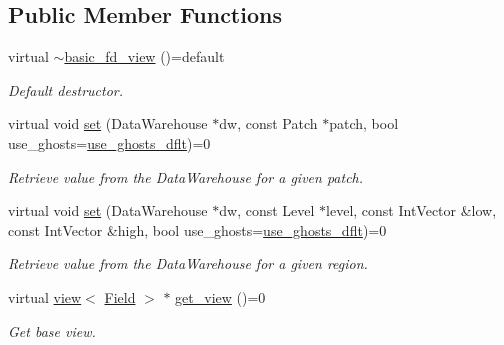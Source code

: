 \subsection*{Public Member Functions}
\begin{DoxyCompactItemize}
\item 
virtual \hyperlink{classUintah_1_1PhaseField_1_1detail_1_1basic__fd__view_3_01ScalarField_3_01T_01_4_00_01STN_01_4_ac8440931815c622c28fd417f9a81fdb9}{$\sim$basic\+\_\+fd\+\_\+view} ()=default
\begin{DoxyCompactList}\small\item\em Default destructor. \end{DoxyCompactList}\item 
virtual void \hyperlink{classUintah_1_1PhaseField_1_1detail_1_1basic__fd__view_3_01ScalarField_3_01T_01_4_00_01STN_01_4_a26d507d016ee4c943903214e7547594a}{set} (Data\+Warehouse $\ast$dw, const Patch $\ast$patch, bool use\+\_\+ghosts=\hyperlink{classUintah_1_1PhaseField_1_1detail_1_1basic__fd__view_3_01ScalarField_3_01T_01_4_00_01STN_01_4_a2faa49acca4f2f6983d318ae64e3ed39}{use\+\_\+ghosts\+\_\+dflt})=0
\begin{DoxyCompactList}\small\item\em Retrieve value from the Data\+Warehouse for a given patch. \end{DoxyCompactList}\item 
virtual void \hyperlink{classUintah_1_1PhaseField_1_1detail_1_1basic__fd__view_3_01ScalarField_3_01T_01_4_00_01STN_01_4_aa5cbbb3b73ea2933659cb082c6d6d863}{set} (Data\+Warehouse $\ast$dw, const Level $\ast$level, const Int\+Vector \&low, const Int\+Vector \&high, bool use\+\_\+ghosts=\hyperlink{classUintah_1_1PhaseField_1_1detail_1_1basic__fd__view_3_01ScalarField_3_01T_01_4_00_01STN_01_4_a2faa49acca4f2f6983d318ae64e3ed39}{use\+\_\+ghosts\+\_\+dflt})=0
\begin{DoxyCompactList}\small\item\em Retrieve value from the Data\+Warehouse for a given region. \end{DoxyCompactList}\item 
virtual \hyperlink{classUintah_1_1PhaseField_1_1detail_1_1view}{view}$<$ \hyperlink{structUintah_1_1PhaseField_1_1ScalarField}{Field} $>$ $\ast$ \hyperlink{classUintah_1_1PhaseField_1_1detail_1_1basic__fd__view_3_01ScalarField_3_01T_01_4_00_01STN_01_4_a2bbf870b332cfd997ec5297428019bc8}{get\+\_\+view} ()=0
\begin{DoxyCompactList}\small\item\em Get base view. \end{DoxyCompactList}\item 

\end{DoxyCompactItemize}
